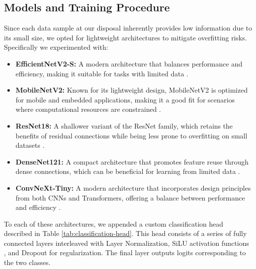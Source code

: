 \subsection{Models and Training Procedure}
Since each data sample at our disposal inherently provides low information due to its small size, we opted for lightweight architectures to mitigate overfitting risks.
Specifically we experimented with:
\begin{itemize}
    \item \textbf{EfficientNetV2-S:} A modern architecture that balances performance and efficiency, making it suitable for tasks with limited data \cite{tan2020efficientnet}.
    \item \textbf{MobileNetV2:} Known for its lightweight design, MobileNetV2 is optimized for mobile and embedded applications, making it a good fit for scenarios where computational resources are constrained \cite{sandler2019mobilenetv2}.
    \item \textbf{ResNet18:} A shallower variant of the ResNet family, which retains the benefits of residual connections while being less prone to overfitting on small datasets \cite{he2015resnet}.
    \item \textbf{DenseNet121:} A compact architecture that promotes feature reuse through dense connections, which can be beneficial for learning from limited data \cite{huang2018densenet121}.
    \item \textbf{ConvNeXt-Tiny:} A modern architecture that incorporates design principles from both CNNs and Transformers, offering a balance between performance and efficiency \cite{liu2022convnext}.
\end{itemize}
To each of these architectures, we appended a custom classification head described in Table \ref{tab:classification-head}. This head consists of a series of fully connected layers interleaved with Layer Normalization, SiLU activation functions \cite{elfwing2017silu}, and Dropout for regularization. The final layer outputs logits corresponding to the two classes.

